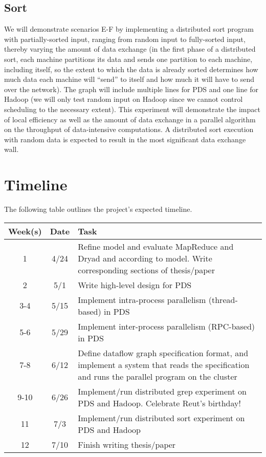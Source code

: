 \documentclass{acm_proc_article-sp}
\begin{document}
\subsection{Sort}
 We will demonstrate scenarios E-F by implementing a distributed sort program with partially-sorted input, ranging from random input to fully-sorted input, thereby varying the amount of data exchange (in the first phase of a distributed sort, each machine partitions its data and sends one partition to each machine, including itself, so the extent to which the data is already sorted determines how much data each machine will ``send'' to itself and how much it will have to send over the network). The graph will include multiple lines for PDS and one line for Hadoop (we will only test random input on Hadoop since we cannot control scheduling to the necessary extent). This experiment will demonstrate the impact of local efficiency as well as the amount of data exchange in a parallel algorithm on the throughput of data-intensive computations. A distributed sort execution with random data is expected to result in the most significant data exchange wall.

\section{Timeline}
The following table outlines the project's expected timeline.
\begin{noop}\begin{tabular}{|c|c|p{2.2in}|} \hline
Week(s)&Date&Task\\ \hline
1 & 4/24 & Refine model and evaluate MapReduce and Dryad and according to model. Write corresponding sections of thesis/paper\\ \hline
2 & 5/1 & Write high-level design for PDS\\ \hline
3-4 & 5/15 & Implement intra-process parallelism (thread-based) in PDS\\ \hline
5-6 & 5/29 & Implement inter-process parallelism (RPC-based) in PDS\\ \hline
7-8 & 6/12 & Define dataflow graph specification format, and implement a system that reads the specification and runs the parallel program on the cluster\\ \hline
9-10 & 6/26 & Implement/run distributed grep experiment on PDS and Hadoop. Celebrate Reut's birthday!\\ \hline
11 & 7/3 & Implement/run distributed sort experiment on PDS and Hadoop\\ \hline
12 & 7/10 & Finish writing thesis/paper\\
\hline\end{tabular}\end{noop}
\end{document}
